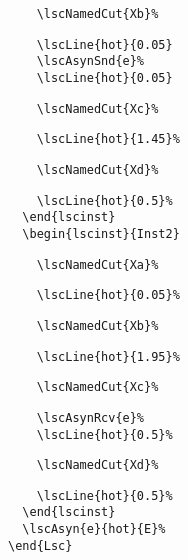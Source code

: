 \documentclass{article}
\begin{document}
\begin{center}
\begin{minipage}{0.45\textwidth}
\verbunskip%
{\begin{verbatim}
    \lscNamedCut{Xb}%
\end{verbatim}}%
\verbunskip%
{\gray\begin{verbatim}
    \lscLine{hot}{0.05}
    \lscAsynSnd{e}%
    \lscLine{hot}{0.05}
\end{verbatim}}%
\verbunskip%
{\begin{verbatim}
    \lscNamedCut{Xc}%
\end{verbatim}}%
\verbunskip%
{\gray\begin{verbatim}
    \lscLine{hot}{1.45}%
\end{verbatim}}%
\verbunskip%
{\begin{verbatim}
    \lscNamedCut{Xd}%
\end{verbatim}}%
\verbunskip%
{\gray\begin{verbatim}
    \lscLine{hot}{0.5}%
  \end{lscinst}
  \begin{lscinst}{Inst2}
\end{verbatim}}%
\verbunskip%
{\begin{verbatim}
    \lscNamedCut{Xa}%
\end{verbatim}}%
\verbunskip%
{\gray\begin{verbatim}
    \lscLine{hot}{0.05}%
\end{verbatim}}%
\verbunskip%
{\begin{verbatim}
    \lscNamedCut{Xb}%
\end{verbatim}}%
\verbunskip%
{\gray\begin{verbatim}
    \lscLine{hot}{1.95}%
\end{verbatim}}%
\verbunskip%
{\begin{verbatim}
    \lscNamedCut{Xc}%
\end{verbatim}}%
\verbunskip%
{\gray\begin{verbatim}
    \lscAsynRcv{e}%
    \lscLine{hot}{0.5}%
\end{verbatim}}%
\verbunskip%
{\begin{verbatim}
    \lscNamedCut{Xd}%
\end{verbatim}}%
\verbunskip%
{\gray\begin{verbatim}
    \lscLine{hot}{0.5}%
  \end{lscinst}
  \lscAsyn{e}{hot}{E}%
\end{Lsc}
\end{verbatim}}%
\end{minipage}
\end{center}%>@>
\end{document}
